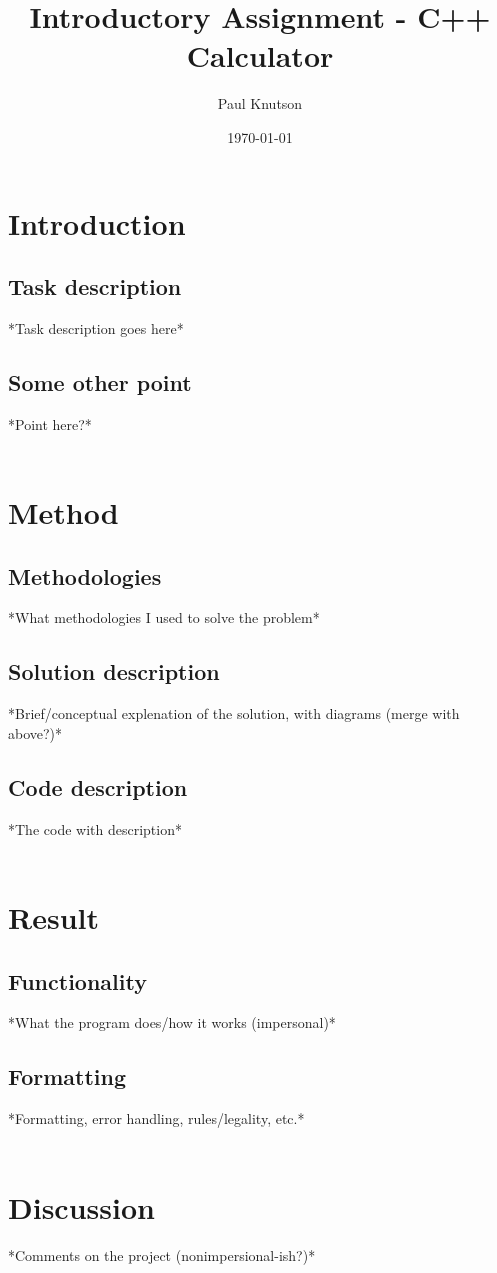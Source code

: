 \documentclass{article}
\begin{document}
	\title{Introductory Assignment - C++ Calculator}
	\date{\today}
	\author{Paul Knutson}
	\maketitle
	\thispagestyle{empty}
	\clearpage

	\tableofcontents{}
	\clearpage
	
	
	\section{Introduction}
		\subsection{Task description}
			*Task description goes here*
		\subsection{Some other point}
			*Point here?*
	\\ \\
	\section{Method}
		\subsection{Methodologies}
			*What methodologies I used to solve the problem*
		\subsection{Solution description}
			*Brief/conceptual explenation of the solution, with diagrams (merge with above?)*
		\subsection{Code description}
			*The code with description*
	\\ \\
	\section{Result}
		\subsection{Functionality}
			*What the program does/how it works (impersonal)*
		\subsection{Formatting}
			*Formatting, error handling, rules/legality, etc.*
	\\ \\
	\section{Discussion}
		*Comments on the project (nonimpersional-ish?)*

		
\end{document}
